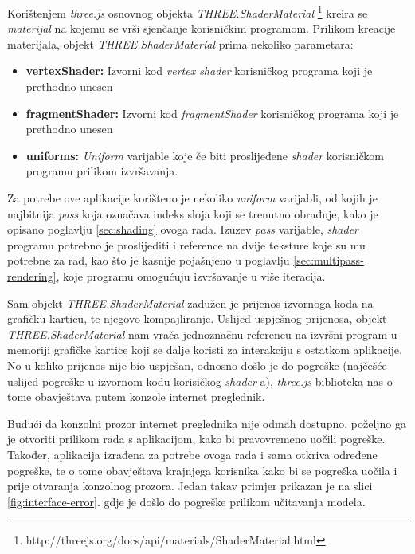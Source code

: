 Korištenjem \emph{three.js} osnovnog objekta \emph{THREE.ShaderMaterial} \footnote{http://threejs.org/docs/api/materials/ShaderMaterial.html} kreira se \emph{materijal} na kojemu se vrši sjenčanje korisničkim programom. Prilikom kreacije materijala, objekt \emph{THREE.ShaderMaterial} prima nekoliko parametara:

\begin{itemize}
\item \textbf{vertexShader:} Izvorni kod \emph{vertex shader} korisničkog programa koji je prethodno unesen
\item \textbf{fragmentShader:} Izvorni kod \emph{fragmentShader} korisničkog programa koji je prethodno unesen
\item \textbf{uniforms:} \emph{Uniform} varijable koje če biti proslijeđene \emph{shader} korisničkom programu prilikom izvršavanja.
\end{itemize}

Za potrebe ove aplikacije korišteno je nekoliko \emph{uniform} varijabli, od kojih je najbitnija \emph{pass} koja označava indeks sloja koji se trenutno obrađuje, kako je opisano  poglavlju \ref{sec:shading} ovoga rada. Izuzev \emph{pass} varijable, \emph{shader} programu potrebno je proslijediti i reference na dvije teksture koje su mu potrebne za rad, kao što je kasnije pojašnjeno u poglavlju \ref{sec:multipass-rendering}, koje programu omogućuju izvršavanje u više iteracija.

Sam objekt \emph{THREE.ShaderMaterial} zadužen je prijenos izvornoga koda na grafičku karticu, te njegovo kompajliranje. Uslijed uspješnog prijenosa, objekt \emph{THREE.ShaderMaterial} nam vrača jednoznačnu referencu na izvršni program u memoriji grafičke kartice koji se dalje koristi za interakciju s ostatkom aplikacije. No u koliko prijenos nije bio uspješan, odnosno došlo je do pogreške (najčešće uslijed pogreške u izvornom kodu korisičkog \emph{shader}-a), \emph{three.js} biblioteka nas o tome obavještava putem konzole internet preglednik.

Budući da konzolni prozor internet preglednika nije odmah dostupno, poželjno ga je otvoriti prilikom rada s aplikacijom, kako bi pravovremeno uočili pogreške. Također, aplikacija izrađena za potrebe ovoga rada i sama otkriva određene pogreške, te o tome obavještava krajnjega korisnika kako bi se pogreška uočila i prije otvaranja konzolnog prozora. Jedan takav primjer prikazan je na slici \ref{fig:interface-error}. gdje je došlo do pogreške prilikom učitavanja modela.


